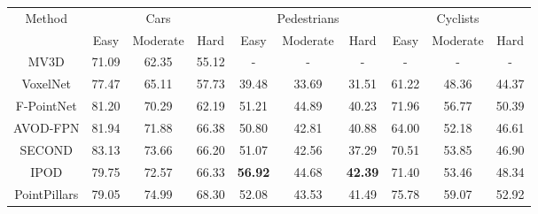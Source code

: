 \documentclass[letterpaper, 10 pt, conference]{ieeeconf}
\begin{document}
\begin{table*}[h]
	\begin{center}
		\begin{tabular}{c|ccc|ccc|ccc}
			\hline
			\multirow{2}{*}{Method}         & \multicolumn{3}{c|}{Cars} & \multicolumn{3}{c|}{Pedestrians} & \multicolumn{3}{c}{Cyclists}                                                                                                       \\ \cline{2-10}
			                                & Easy                      & Moderate                         & Hard                         & Easy           & Moderate       & Hard           & Easy           & Moderate       & Hard           \\ \hline
			MV3D\cite{chen2017multi}        & 71.09                     & 62.35                            & 55.12                        & -              & -              & -              & -              & -              & -              \\
			VoxelNet\cite{zhou2018voxelnet} & 77.47                     & 65.11                            & 57.73                        & 39.48          & 33.69          & 31.51          & 61.22          & 48.36          & 44.37          \\
			F-PointNet\cite{qi2018frustum}  & 81.20                     & 70.29                            & 62.19                        & 51.21          & 44.89          & 40.23          & 71.96          & 56.77          & 50.39          \\
			AVOD-FPN\cite{ku2018joint}      & 81.94                     & 71.88                            & 66.38                        & 50.80          & 42.81          & 40.88          & 64.00          & 52.18          & 46.61          \\
			SECOND\cite{yan2018second}      & 83.13                     & 73.66                            & 66.20                        & 51.07          & 42.56          & 37.29          & 70.51          & 53.85          & 46.90          \\
			IPOD\cite{yang2018ipod}         & 79.75                     & 72.57                            & 66.33                        & \textbf{56.92} & 44.68          & \textbf{42.39} & 71.40          & 53.46          & 48.34          \\
			PointPillars\cite{lang2018pointpillars}
			                                & 79.05                     & 74.99                            & 68.30                        & 52.08          & 43.53          & 41.49          & 75.78          & 59.07          & 52.92          \\

\end{tabular}
\end{center}
\end{table*}
\end{document}
